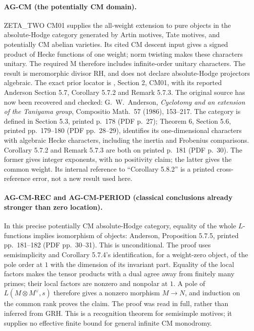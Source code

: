 \documentclass[11pt,a4paper]{article}
\begin{document}
\paragraph{AG-CM (the potentially CM domain).}
ZETA\_TWO CM01 supplies the all-weight extension to pure objects in the
absolute-Hodge category generated by Artin motives, Tate motives, and
potentially CM abelian varieties. Its cited CM descent input gives a signed
product of Hecke functions of one weight; norm twisting makes these
characters unitary. The required M therefore includes infinite-order
unitary characters. The result is meromorphic divisor RH, and does not
declare absolute-Hodge projectors algebraic. The exact prior locator is
, Section 2, CM01,
with its reported Anderson Section 5.7, Corollary 5.7.2 and Remark 5.7.3.
The original source has now been recovered and checked: G.~W.~Anderson,
\emph{Cyclotomy and an extension of the Taniyama group}, Compositio
Math.~57 (1986), 153--217. The category is defined in Section 5.3,
printed p.~178 (PDF p.~27); Theorem 6, Section 5.6, printed pp.~179--180
(PDF pp.~28--29), identifies its one-dimensional characters with algebraic
Hecke characters, including the inertia and Frobenius comparisons.
Corollary 5.7.2 and Remark 5.7.3 are both on printed p.~181 (PDF p.~30).
The former gives integer exponents, with no positivity claim; the latter
gives the common weight. Its internal reference to ``Corollary 5.8.2'' is
a printed cross-reference error, not a new result used here.

\paragraph{AG-CM-REC and AG-CM-PERIOD (classical conclusions already
stronger than zero location).}
In this precise potentially CM absolute-Hodge category, equality of the
whole $L$-functions implies isomorphism of objects: Anderson,
Proposition 5.7.5, printed pp.~181--182 (PDF pp.~30--31). This is
unconditional. The proof uses semisimplicity and Corollary 5.7.4's
identification, for a weight-zero object, of the pole order at $1$ with
the dimension of its invariant part. Equality of the local factors makes
the tensor products with a dual agree away from finitely many primes;
their local factors are nonzero and nonpolar at $1$. A pole of
$L(M\otimes M^\vee,s)$ therefore gives a nonzero morphism
$M\longrightarrow N$, and induction on the common rank proves the
claim. The proof was read in full, rather than inferred from GRH.
This is a recognition theorem for semisimple motives; it supplies no
effective finite bound for general infinite CM monodromy.
\end{document}
